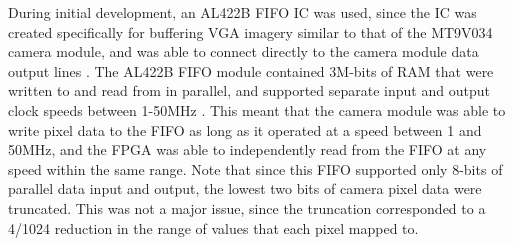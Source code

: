 \par
During initial development, an AL422B FIFO IC was used, since the IC was created specifically for buffering VGA imagery similar to that of the MT9V034 camera module, and was able to connect directly to the camera module data output lines \cite{al422b}. The AL422B FIFO module contained 3M-bits of RAM that were written to and read from in parallel, and supported separate input and output clock speeds between 1-50MHz \cite{al422b}. This meant that the camera module was able to write pixel data to the FIFO as long as it operated at a speed between 1 and 50MHz, and the FPGA was able to independently read from the FIFO at any speed within the same range. Note that since this FIFO supported only 8-bits of parallel data input and output, the lowest two bits of camera pixel data were truncated. This was not a major issue, since the truncation corresponded to a 4/1024 reduction in the range of values that each pixel mapped to.